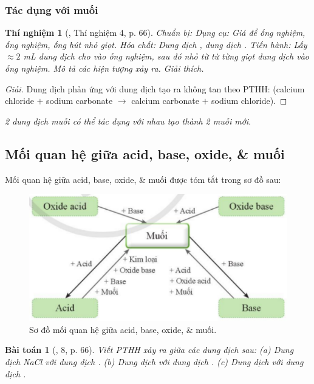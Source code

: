 \documentclass{article}
\newtheorem{baitoan}{Bài toán}
\newtheorem{thinghiem}{Thí nghiệm}
\begin{document}
\subsubsection{Tác dụng với muối}

\begin{thinghiem}[\cite{SGK_KHTN_8_Canh_Dieu}, Thí nghiệm 4, p. 66]
	\emph{Chuẩn bị:} Dụng cụ: Giá để ống nghiệm, ống nghiệm, ống hút nhỏ giọt. Hóa chất: Dung dịch \emph{}, dung dịch \emph{}. \emph{Tiến hành:} Lấy $\approx2$ \emph{mL} dung dịch \emph{} cho vào ống nghiệm, sau đó nhỏ từ từ từng giọt dung dịch \emph{} vào ống nghiệm. Mô tả các hiện tượng xảy ra. Giải thích.
\end{thinghiem}

\begin{proof}[Giải]
	Dung dịch  phản ứng với dung dịch  tạo ra  không tan theo PTHH:  (calcium chloride $+$ sodium carbonate $\to$ calcium carbonate $+$ sodium chloride).
\end{proof}
\textit{2 dung dịch muối có thể tác dụng với nhau tạo thành 2 muối mới}.

\subsection{Mối quan hệ giữa acid, base, oxide, \& muối}
Mối quan hệ giữa acid, base, oxide, \& muối được tóm tắt trong sơ đồ sau:
\begin{figure}[H]
	\centering
	\includegraphics[scale=0.3]{acid_base_oxide_salt}
	\caption{Sơ đồ mối quan hệ giữa acid, base, oxide, \& muối.}
	\label{fig:acid_base_oxide_salt}
\end{figure}

\begin{baitoan}[\cite{SGK_KHTN_8_Canh_Dieu}, 8, p. 66]
	Viết PTHH xảy ra giữa các dung dịch sau: (a) Dung dịch \emph{NaCl} với dung dịch \emph{}. (b) Dung dịch \emph{} với dung dịch \emph{}. (c) Dung dịch \emph{} với dung dịch \emph{}.
\end{baitoan}
\end{document}
